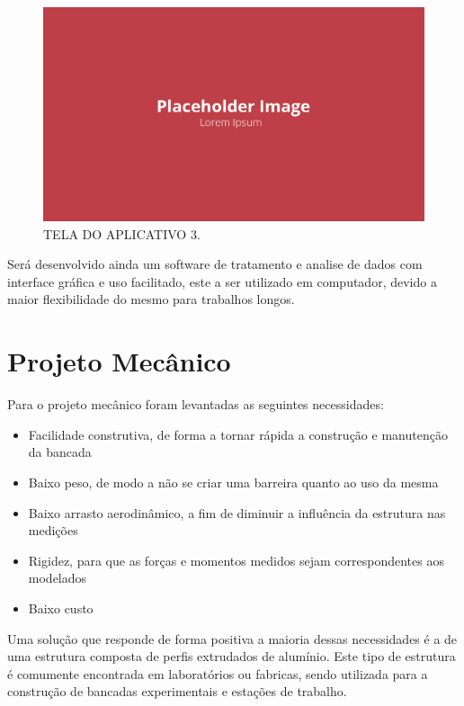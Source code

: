 \begin{figure}[!ht]
    \centering
    \includegraphics[width=.8\linewidth]{figuras/outras/placeholder.png}
    \caption{TELA DO APLICATIVO 3\cite{autor}.}
    \label{fig:tela_aplicativo_3}
\end{figure}

Será desenvolvido ainda um software de tratamento e analise de dados com interface gráfica e uso facilitado, este a ser utilizado em computador, devido a maior flexibilidade do mesmo para trabalhos longos.

\section{Projeto Mecânico}

Para o projeto mecânico foram levantadas as seguintes necessidades:

\begin{itemize}
    \item Facilidade construtiva, de forma a tornar rápida a construção e manutenção da bancada
    \item Baixo peso, de modo a não se criar uma barreira quanto ao uso da mesma
    \item Baixo arrasto aerodinâmico, a fim de diminuir a influência da estrutura nas medições
    \item Rigidez, para que as forças e momentos medidos sejam correspondentes aos modelados
    \item Baixo custo
\end{itemize}

Uma solução que responde de forma positiva a maioria dessas necessidades é a de uma estrutura composta de perfis extrudados de alumínio. Este tipo de estrutura é comumente encontrada em laboratórios ou fabricas, sendo utilizada para a construção de bancadas experimentais e estações de trabalho.

